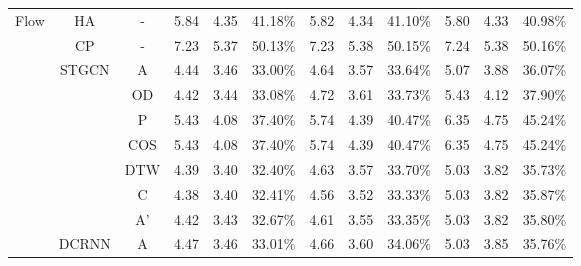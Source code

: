 \begin{table}[t!]
\begin{center}
{\begin{tabular}{c|c|c|ccc|ccc|ccc}
                \multirow{23}{*}{Flow}           & HA                     & -                       & 5.84       & 4.35      & 41.18\%     & 5.82      & 4.34      & 41.10\%     & 5.80       & 4.33       & 40.98\%     \\
                                                 & CP                     & -                       & 7.23       & 5.37      & 50.13\%     & 7.23      & 5.38      & 50.15\%     & 7.24       & 5.38       & 50.16\%     \\
                \cline{2-12}
                                                 & \multirow{7}{*}{STGCN} & A                       & 4.44       & 3.46      & 33.00\%     & 4.64      & 3.57      & 33.64\%     & 5.07       & 3.88       & 36.07\%     \\
                                                 &                        & OD                      & 4.42       & 3.44      & 33.08\%     & 4.72      & 3.61      & 33.73\%     & 5.43       & 4.12       & 37.90\%     \\
                                                 &                        & P                       & 5.43       & 4.08      & 37.40\%     & 5.74      & 4.39      & 40.47\%     & 6.35       & 4.75       & 45.24\%     \\
                                                 &                        & COS                     & 5.43       & 4.08      & 37.40\%     & 5.74      & 4.39      & 40.47\%     & 6.35       & 4.75       & 45.24\%     \\
                                                 &                        & DTW                     & 4.39       & 3.40      & 32.40\%     & 4.63      & 3.57      & 33.70\%     & 5.03       & 3.82       & 35.73\%     \\
                                                 &                        & C                       & 4.38       & 3.40      & 32.41\%     & 4.56      & 3.52      & 33.33\%     & 5.03       & 3.82       & 35.87\%     \\
                                                 &                        & A'                      & 4.42       & 3.43      & 32.67\%     & 4.61      & 3.55      & 33.35\%     & 5.03       & 3.82       & 35.80\%     \\
                \cline{2-12}
                                                 & \multirow{7}{*}{DCRNN} & A                       & 4.47       & 3.46      & 33.01\%     & 4.66      & 3.60      & 34.06\%     & 5.03       & 3.85       & 35.76\%     \\

\end{tabular}}
\end{center}
\end{table}
